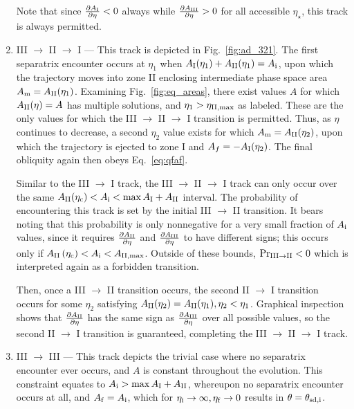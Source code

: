 \documentclass[
        fleqn,
        usenatbib,
        referee,
    ]{mnras}
\newcommand*{\pd}[2]{\frac{\partial#1}{\partial#2}}
\newcommand*{\p}[1]{\left(#1\right)}
\begin{document}
\begin{enumerate}
        Note that since $\pd{A_{\rm I}}{\eta} < 0$ always while $\pd{A_{\rm
        III}}{\eta} > 0$ for all accessible $\eta_{\star}$, this track is always
        permitted.

    \item III $\to$ II $\to$ I --- This track is depicted in
        Fig.~\ref{fig:ad_321}. The first separatrix encounter occurs at $\eta_1$
        when $A_{\rm I}(\eta_1) + A_{\rm II}(\eta_1) = A_{\rm i}$, upon which
        the trajectory moves into zone II enclosing intermediate phase space
        area $A_{\rm m} = A_{\rm II}(\eta_1)$. Examining
        Fig.~\ref{fig:eq_areas}, there exist values $A$ for which $A_{\rm
        II}(\eta) = A$ has multiple solutions, and $\eta_1 > \eta_{\rm II,
        \max}$ as labeled. These are the only values for which the III $\to$ II
        $\to$ I transition is permitted. Thus, as $\eta$ continues to decrease,
        a second $\eta_2$ value exists for which $A_{\rm m} = A_{\rm
        II}(\eta_2)$, upon which the trajectory is ejected to zone I and $A_f =
        -A_{\rm I}(\eta_2)$. The final obliquity again then obeys
        Eq.~\eqref{eq:qfaf}.

        Similar to the III $\to$ I track, the III $\to$ II $\to$ I track can
        only occur over the same $A_{\rm II}(\eta_{\rm c}) < A_{\rm i} < \max
        A_{\rm I} + A_{\rm II}$ interval. The probability of encountering this
        track is set by the initial III $\to$ II transition. It bears noting
        that this probability is only nonnegative for a very small fraction of
        $A_{\rm i}$ values, since it requires $\pd{A_{\rm II}}{\eta}$ and
        $\pd{A_{\rm III}}{\eta}$ to have different signs; this occurs only if
        $A_{\rm II}\p{\eta_{\rm c}} < A_{\rm i} < A_{\rm II, \max}$. Outside of
        these bounds, $\Pr_{\rm III \to II} < 0$ which is interpreted again as a
        forbidden transition.

        Then, once a III $\to$ II transition occurs, the second II $\to$ I
        transition occurs for some $\eta_2$ satisfying $A_{\rm II}(\eta_2) =
        A_{\rm II}(\eta_1), \eta_2 < \eta_1$. Graphical inspection shows that
        $\pd{A_{\rm II}}{\eta}$ has the same sign as $\pd{A_{\rm III}}{\eta}$
        over all possible values, so the second II $\to$ I transition is
        guaranteed, completing the III $\to$ II $\to$ I track.

    \item III $\to$ III --- This track depicts the trivial case where no
        separatrix encounter ever occurs, and $A$ is constant throughout the
        evolution. This constraint equates to $A_{\rm i} > \max A_{\rm I} + A_{\rm
        II}$, whereupon no separatrix encounter occurs at all, and $A_{\rm f} =
        A_{\rm i}$,
        which for $\eta_{\rm i} \to \infty, \eta_{\rm f} \to 0$ results in $\theta =
        \theta_{\rm sd, i}$.


\end{enumerate}
\end{document}

